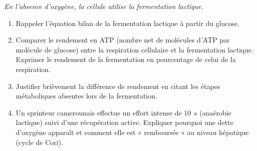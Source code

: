 \documentclass[11pt]{article}
\begin{document}
\begin{exercice}
    \textit{En l'absence d'oxygène, la cellule utilise la fermentation lactique.}
    \begin{enumerate}
        \item Rappeler l'équation bilan de la fermentation lactique à partir du glucose.
        \item Comparer le rendement en ATP (nombre net de molécules d'ATP par molécule de glucose) entre la respiration cellulaire et la fermentation lactique. Exprimer le rendement de la fermentation en pourcentage de celui de la respiration.
        \item Justifier brièvement la différence de rendement en citant les étapes métaboliques absentes lors de la fermentation.
        \item Un sprinteur camerounais effectue un effort intense de \SI{10}{s} (anaérobie lactique) suivi d'une récupération active. Expliquer pourquoi une dette d'oxygène apparaît et comment elle est « remboursée » au niveau hépatique (cycle de Cori).
    \end{enumerate}
\end{exercice}
\end{document}
